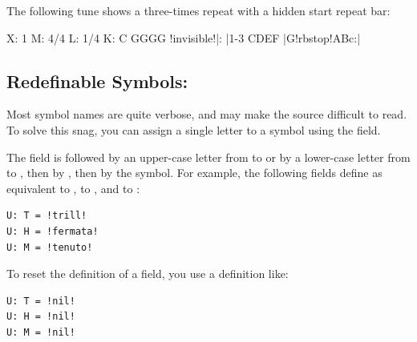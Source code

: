 \documentclass[a4paper,12pt]{book}
\begin{document}
The following tune shows a three-times repeat with a hidden start
repeat bar:

\begin{abcsource}
X: 1
M: 4/4
L: 1/4
K: C
GGGG !invisible!|: |1-3 CDEF |G!rbstop!ABc:|
\end{abcsource}


  
  
  


\subsection{Redefinable Symbols: }

Most symbol names are quite verbose, and may make the source difficult
to read. To solve this snag, you can assign a single letter to a
symbol using the  field.

The field is followed by an upper-case letter from  to 
or by a lower-case letter from  to , then by \car{=},
then by the symbol. For example, the following  fields
define  as equivalent to ,  to
, and  to :

\begin{verbatim}
U: T = !trill!
U: H = !fermata!
U: M = !tenuto!
\end{verbatim}


To reset the definition of a  field, you use a definition
like:

\begin{verbatim}
U: T = !nil!
U: H = !nil!
U: M = !nil!
\end{verbatim}

\end{document}
